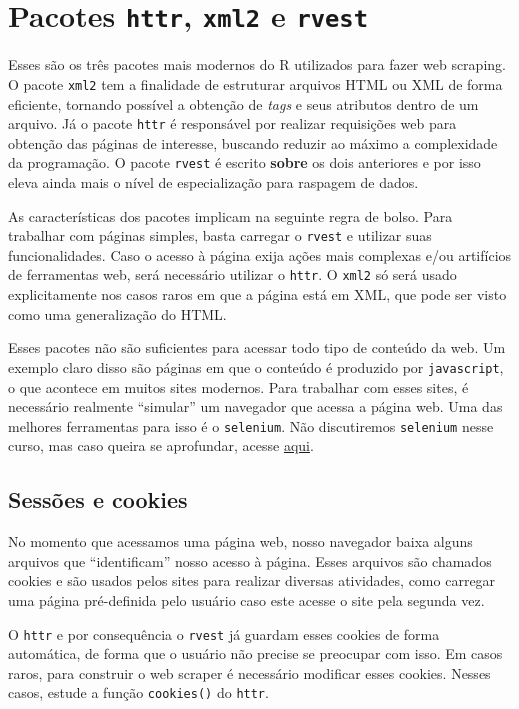 \documentclass[]{book}
\begin{document}
\section{\texorpdfstring{Pacotes \texttt{httr}, \texttt{xml2} e
\texttt{rvest}}{Pacotes httr, xml2 e rvest}}\label{pacotes-httr-xml2-e-rvest}

Esses são os três pacotes mais modernos do R utilizados para fazer web
scraping. O pacote \texttt{xml2} tem a finalidade de estruturar arquivos
HTML ou XML de forma eficiente, tornando possível a obtenção de
\emph{tags} e seus atributos dentro de um arquivo. Já o pacote
\texttt{httr} é responsável por realizar requisições web para obtenção
das páginas de interesse, buscando reduzir ao máximo a complexidade da
programação. O pacote \texttt{rvest} é escrito \textbf{sobre} os dois
anteriores e por isso eleva ainda mais o nível de especialização para
raspagem de dados.

As características dos pacotes implicam na seguinte regra de bolso. Para
trabalhar com páginas simples, basta carregar o \texttt{rvest} e
utilizar suas funcionalidades. Caso o acesso à página exija ações mais
complexas e/ou artifícios de ferramentas web, será necessário utilizar o
\texttt{httr}. O \texttt{xml2} só será usado explicitamente nos casos
raros em que a página está em XML, que pode ser visto como uma
generalização do HTML.

Esses pacotes não são suficientes para acessar todo tipo de conteúdo da
web. Um exemplo claro disso são páginas em que o conteúdo é produzido
por \texttt{javascript}, o que acontece em muitos sites modernos. Para
trabalhar com esses sites, é necessário realmente ``simular'' um
navegador que acessa a página web. Uma das melhores ferramentas para
isso é o \texttt{selenium}. Não discutiremos \texttt{selenium} nesse
curso, mas caso queira se aprofundar, acesse
\href{http://www.seleniumhq.org/}{aqui}.

\subsection{Sessões e cookies}\label{sessoes-e-cookies}

No momento que acessamos uma página web, nosso navegador baixa alguns
arquivos que ``identificam'' nosso acesso à página. Esses arquivos são
chamados cookies e são usados pelos sites para realizar diversas
atividades, como carregar uma página pré-definida pelo usuário caso este
acesse o site pela segunda vez.

O \texttt{httr} e por consequência o \texttt{rvest} já guardam esses
cookies de forma automática, de forma que o usuário não precise se
preocupar com isso. Em casos raros, para construir o web scraper é
necessário modificar esses cookies. Nesses casos, estude a função
\texttt{cookies()} do \texttt{httr}.
\end{document}
